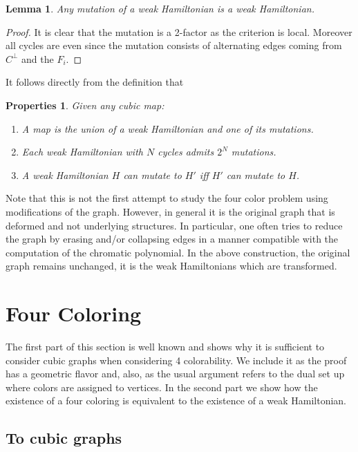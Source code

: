 \documentclass[11pt]{amsart}
\newtheorem{lem}{Lemma}[section]
\newtheorem{pro}{Properties}[section]
\begin{document}
\begin{lem}
\label{lem:freecycle}
Any mutation of a weak Hamiltonian is a weak Hamiltonian. 
\end{lem}

\begin{proof}
It is clear that the mutation is a 2-factor as the criterion is local. 
Moreover all cycles are even since the mutation consists of alternating edges coming from $C^{\perp}$ and the $F_{i}$.
\end{proof}

It follows directly from the definition that 

\begin{pro} Given any cubic map:
\label{pro:properties}
\begin{enumerate} 
\item A map is the union of a weak Hamiltonian and one of its mutations.
\item Each weak Hamiltonian with $N$ cycles admits $2^{N}$ mutations.
\item A weak Hamiltonian $H$ can mutate to $H'$ iff $H'$ can mutate to $H$.
\end{enumerate}
\end{pro}

Note that this is not the first attempt to study the four color problem using modifications of the graph.
However, in general it is the original graph that is deformed and not underlying structures.
In particular, one often tries to reduce the graph by erasing and/or collapsing edges in a manner compatible with the computation of the chromatic polynomial.
In the above construction, the original graph remains unchanged, it is the weak Hamiltonians which are transformed.

\section{Four Coloring}
The first part of this section is well known and shows why it is sufficient to consider cubic graphs when considering 4 colorability.
We include it as the proof has a geometric flavor and, also, as the usual argument refers to the dual set up where colors are assigned to vertices.
In the second part we show how the existence of a four coloring is equivalent to the existence of a weak Hamiltonian.

\subsection{To cubic graphs}
\end{document}
